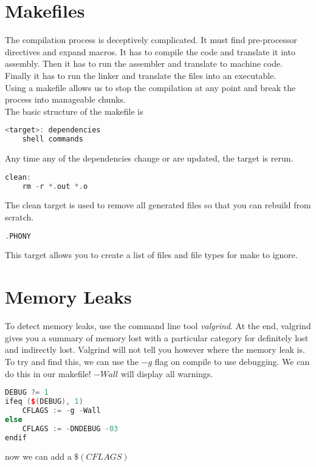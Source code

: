 \documentclass[a4paper, 11pt]{article}
\begin{document}
\section*{Makefiles}
The compilation process is deceptively complicated. It must find pre-processor
directives and expand macros. It has to compile the code and translate it into
assembly. Then it has to run the assembler and translate to machine code.
Finally it has to run the linker and translate the files into an executable. \\

\noindent Using a makefile allows us to stop the compilation at any point and break the
process into manageable chunks. \\

\noindent The basic structure of the makefile is

\begin{lstlisting}[language=C++]
<target>: dependencies
    shell commands
\end{lstlisting}
Any time any of the dependencies change or are updated, the target is rerun.  

\begin{lstlisting}[language=C++]
clean:
    rm -r *.out *.o 
\end{lstlisting}
The clean target is used to remove all generated files so that you can rebuild
from scratch. 


\begin{lstlisting}[language=C++]
.PHONY
\end{lstlisting}
This target allows you to create a list of files and file types for make to
ignore. \\


\section*{Memory Leaks}
To detect memory leaks, use the command line tool \textit{valgrind}. At the end,
valgrind gives you a summary of memory lost with a particular category for
definitely lost and indirectly lost. Valgrind will not tell you however where
the memory leak is. \\

To try and find this, we can use the $-g$ flag on compile to use debugging. We
can do this in our makefile! $-Wall$ will display all warnings. 


\begin{lstlisting}[language=C++]
DEBUG ?= 1
ifeq ($(DEBUG), 1)
    CFLAGS := -g -Wall
else 
    CFLAGS := -DNDEBUG -03
endif
\end{lstlisting}
now we can add a $\$(CFLAGS)$ 
\end{document}

